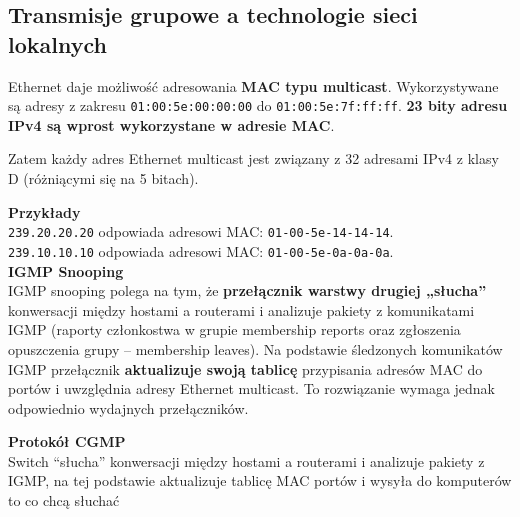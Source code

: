 \documentclass[../main.tex]{subfiles}
\begin{document}
    \subsection{Transmisje grupowe a technologie sieci lokalnych}

    Ethernet daje możliwość adresowania \textbf{MAC typu multicast}.
    Wykorzystywane są adresy z
    zakresu \texttt{01:00:5e:00:00:00} do \texttt{01:00:5e:7f:ff:ff}.
    \textbf{23 bity adresu IPv4 są wprost wykorzystane w adresie MAC}.

    Zatem każdy adres Ethernet multicast jest związany z 32 adresami IPv4 z
    klasy D (różniącymi się na 5 bitach).

    \textbf{Przykłady}\\
    \texttt{239.20.20.20} odpowiada adresowi MAC: \texttt{01-00-5e-14-14-14}.\\
    \texttt{239.10.10.10} odpowiada adresowi MAC: \texttt{01-00-5e-0a-0a-0a}.\\


    \textbf{IGMP Snooping}\\
    IGMP snooping polega na tym, że \textbf{przełącznik warstwy drugiej „słucha”} konwersacji między
    hostami a routerami i analizuje pakiety z komunikatami IGMP (raporty członkostwa w grupie
    membership reports oraz zgłoszenia opuszczenia grupy – membership leaves). Na podstawie
    śledzonych komunikatów IGMP przełącznik \textbf{aktualizuje swoją tablicę} przypisania adresów
    MAC do portów i uwzględnia adresy Ethernet
    multicast.
    To rozwiązanie wymaga jednak odpowiednio wydajnych przełączników.

    \textbf{Protokół CGMP}\\
    Switch “słucha” konwersacji między hostami a routerami i analizuje pakiety z IGMP, na tej podstawie aktualizuje tablicę MAC portów i wysyła do komputerów to co chcą słuchać
\end{document}
